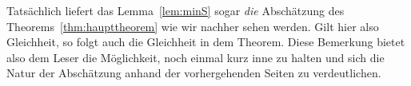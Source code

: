 \begin{bem}
	Tatsächlich liefert das Lemma~\ref{lem:minS} sogar \emph{die} Abschätzung des Theorems~\ref{thm:haupttheorem} wie wir nachher sehen werden. Gilt hier also Gleichheit, so folgt auch die Gleichheit in dem Theorem. Diese Bemerkung bietet also dem Leser die Möglichkeit, noch einmal kurz inne zu halten und sich die Natur der Abschätzung anhand der vorhergehenden Seiten zu verdeutlichen.
\end{bem}
